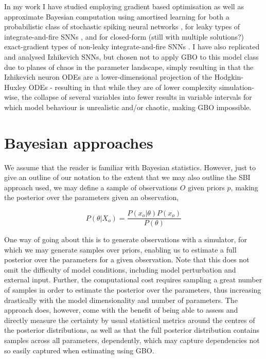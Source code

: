 \documentclass[mphil,deptreport,ianc]{infthesis} %
\begin{document}
In my work I have studied employing gradient based optimisation as well as approximate Bayesian computation using amortised learning for both a probabilistic class of stochastic spiking neural networks \cite{Rene2020}, for leaky types of integrate-and-fire SNNs \cite{allen_glif_white_paper}, and for closed-form (still with multiple solutions?) exact-gradient types of non-leaky integrate-and-fire SNNs \cite{Huh2017}.
I have also replicated and analysed Izhikevich SNNs, but chosen not to apply GBO to this model class due to planes of chaos in the parameter landscape, simply resulting in that the Izhikevich neuron ODEs are a lower-dimensional projection of the Hodgkin-Huxley ODEs - resulting in that while they are of lower complexity simulation-wise, the collapse of several variables into fewer results in variable intervals for which model behaviour is unrealistic and/or chaotic, making GBO impossible.


\section{Bayesian approaches}

We assume that the reader is familiar with Bayesian statistics. However, just to give an outline of our notation to the extent that we may also outline the SBI approach used, we may define a sample of observations $O$ given priors $p$, making the posterior over the parameters given an observation,

\begin{equation}
    P(\theta|X_o) = \frac{P(x_o|\theta)P(x_o)}{P(\theta)}
\end{equation}

One way of going about this is to generate observations with a simulator, for which we may generate samples over priors, enabling us to estimate a full posterior over the parameters for a given observation.
Note that this does not omit the difficulty of model conditions, including model perturbation and external input.
Further, the computational cost requires sampling a great number of samples in order to estimate the posterior over the parameters, thus increasing drastically with the model dimensionality and number of parameters.
The approach does, however, come with the benefit of being able to assess and directly measure the certainty by usual statistical metrics around the centres of the posterior distributions, as well as that the full posterior distribution contains samples across all parameters, dependently, which may capture dependencies not so easily captured when estimating using GBO.
\end{document}

